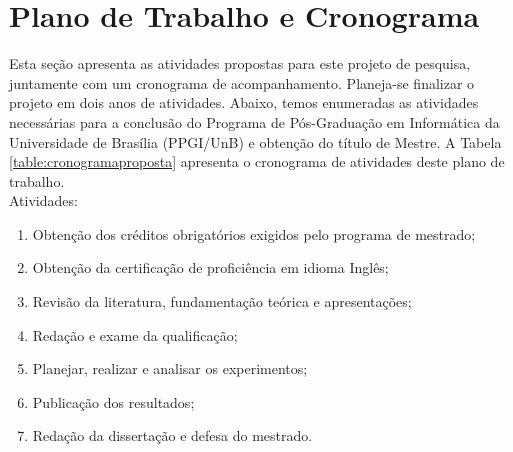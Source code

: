 
\section{Plano de Trabalho e Cronograma}

Esta seção apresenta as atividades propostas para este projeto de pesquisa, juntamente com um cronograma de acompanhamento. Planeja-se finalizar o projeto em dois anos de atividades. Abaixo, temos enumeradas as atividades necessárias para a conclusão do Programa de Pós-Graduação em Informática da Universidade de Brasília (PPGI/UnB) e obtenção do título de Mestre. A Tabela \ref{table:cronogramaproposta} apresenta o cronograma de atividades deste plano de trabalho.\\

Atividades:

\begin{enumerate}
    \item Obtenção dos créditos obrigatórios exigidos pelo programa de mestrado;
    \item Obtenção da certificação de proficiência em idioma Inglês;
    \item Revisão da literatura, fundamentação teórica e apresentações;
    \item Redação e exame da qualificação;
    \item Planejar, realizar e analisar os experimentos;
    \item Publicação dos resultados;
    \item Redação da dissertação e defesa do mestrado.
\end{enumerate}

